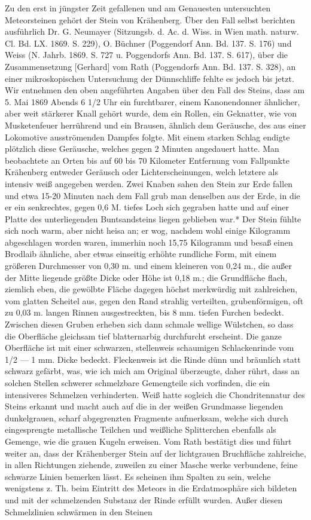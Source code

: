 \documentclass[a4paper, 11pt, oneside]{article}
\begin{document}
Zu den erst in jüngster Zeit gefallenen und am Genauesten untersuchten Meteorsteinen gehört der Stein von Krähenberg. Über den Fall selbst berichten ausführlich Dr. G. Neumayer (Sitzungsb. d. Ac. d. Wiss. in Wien math. naturw. Cl. Bd. LX. 1869. S. 229), O. Büchner (Poggendorf Ann. Bd. 137. S. 176) und Weiss (N. Jahrb. 1869. S. 727 u. Poggendorfs Ann. Bd. 137. S. 617), über die Zusammensetzung [Gerhard] vom Rath (Poggendorfs Ann. Bd. 137. S. 328), an einer mikroskopischen Untersuchung der Dünnschliffe fehlte es jedoch bis jetzt. Wir entnehmen den oben angeführten Angaben über den Fall des Steins, dass am 5. Mai 1869 Abends 6 1/2 Uhr ein furchtbarer, einem Kanonendonner ähnlicher, aber weit stärkerer Knall gehört wurde, dem ein Rollen, ein Geknatter, wie von Musketenfeuer herrührend und ein Brausen, ähnlich dem Geräusche, des aus einer Lokomotive ausströmenden Dampfes folgte. Mit einem starken Schlag endigte plötzlich diese Geräusche, welches gegen 2 Minuten angedauert hatte. Man beobachtete an Orten bis auf 60 bis 70 Kilometer Entfernung vom Fallpunkte Krähenberg entweder Geräusch oder Lichterscheinungen, welch letztere als intensiv weiß angegeben werden. Zwei Knaben sahen den Stein zur Erde fallen und etwa 15-20 Minuten nach dem Fall grub man denselben aus der Erde, in die er ein senkrechtes, gegen 0,6 M. tiefes Loch sich gegraben hatte und auf einer Platte des unterliegenden Buntsandsteins liegen geblieben war.* Der Stein fühlte sich noch warm, aber nicht heisa an; er wog, nachdem wohl einige Kilogramm abgeschlagen worden waren, immerhin noch 15,75 Kilogramm und besaß einen Brodlaib ähnliche, aber etwas einseitig erhöhte rundliche Form, mit einem größeren Durchmesser von 0,30 m. und einem kleineren von 0,24 m., die außer der Mitte liegende größte Dicke oder Höhe ist 0,18 m.; die Grundfläche flach, ziemlich eben, die gewölbte Fläche dagegen höchst merkwürdig mit zahlreichen, vom glatten Scheitel aus, gegen den Rand strahlig verteilten, grubenförmigen, oft zu 0,03 m. langen Rinnen ausgestreckten, bis 8 mm. tiefen Furchen bedeckt. Zwischen diesen Gruben erheben sich dann schmale wellige Wülstchen, so dass die Oberfläche gleichsam tief blatternarbig durchfurcht erscheint. Die ganze Oberfläche ist mit einer schwarzen, stellenweis schaumigen Schlackenrinde vom 1/2 — 1 mm. Dicke bedeckt. Fleckenweis ist die Rinde dünn und bräunlich statt schwarz gefärbt, was, wie ich mich am Original überzeugte, daher rührt, dass an solchen Stellen schwerer schmelzbare Gemengteile sich vorfinden, die ein intensiveres Schmelzen verhinderten. Weiß hatte sogleich die Chondritennatur des Steins erkannt und macht auch auf die in der weißen Grundmasse liegenden dunkelgrauen, scharf abgegrenzten Fragmente aufmerksam, welche sich durch eingesprengte metallische Teilchen und weißliche Splitterchen ebenfalls als Gemenge, wie die grauen Kugeln erweisen. Vom Rath bestätigt dies und führt weiter an, dass der Krähenberger Stein auf der lichtgrauen Bruchfläche zahlreiche, in allen Richtungen ziehende, zuweilen zu einer Masche werke verbundene, feine schwarze Linien bemerken lässt. Es scheinen ihm Spalten zu sein, welche wenigstens z. Th. beim Eintritt des Meteors in die Erdatmosphäre sich bildeten und mit der schmelzenden Substanz der Rinde erfüllt wurden. Außer diesen Schmelzlinien schwärmen in den Steinen 
\end{document}
